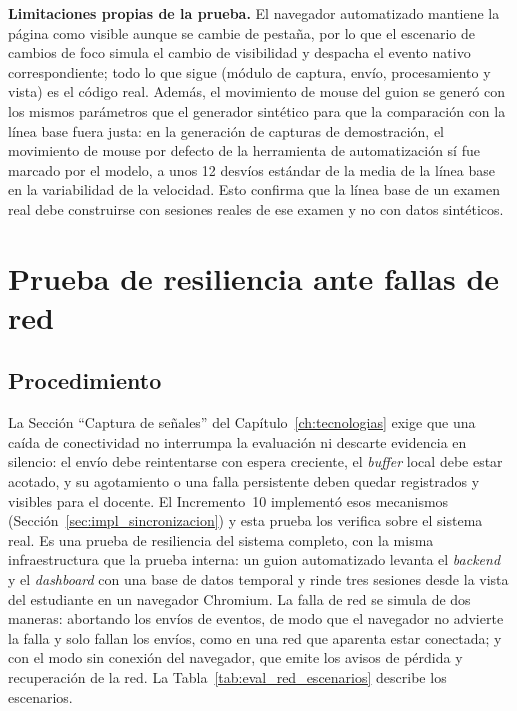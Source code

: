 \textbf{Limitaciones propias de la prueba.} El navegador automatizado mantiene la página como visible aunque se cambie de pestaña, por lo que el escenario de cambios de foco simula el cambio de visibilidad y despacha el evento nativo correspondiente; todo lo que sigue (módulo de captura, envío, procesamiento y vista) es el código real. Además, el movimiento de mouse del guion se generó con los mismos parámetros que el generador sintético para que la comparación con la línea base fuera justa: en la generación de capturas de demostración, el movimiento de mouse por defecto de la herramienta de automatización sí fue marcado por el modelo, a unos 12 desvíos estándar de la media de la línea base en la variabilidad de la velocidad. Esto confirma que la línea base de un examen real debe construirse con sesiones reales de ese examen y no con datos sintéticos.

\section{Prueba de resiliencia ante fallas de red}
\label{sec:eval_prueba_red}

\subsection{Procedimiento}

La Sección ``Captura de señales'' del Capítulo~\ref{ch:tecnologias} exige que una caída de conectividad no interrumpa la evaluación ni descarte evidencia en silencio: el envío debe reintentarse con espera creciente, el \textit{buffer} local debe estar acotado, y su agotamiento o una falla persistente deben quedar registrados y visibles para el docente. El Incremento~10 implementó esos mecanismos (Sección~\ref{sec:impl_sincronizacion}) y esta prueba los verifica sobre el sistema real. Es una prueba de resiliencia del sistema completo, con la misma infraestructura que la prueba interna: un guion automatizado levanta el \textit{backend} y el \textit{dashboard} con una base de datos temporal y rinde tres sesiones desde la vista del estudiante en un navegador Chromium. La falla de red se simula de dos maneras: abortando los envíos de eventos, de modo que el navegador no advierte la falla y solo fallan los envíos, como en una red que aparenta estar conectada; y con el modo sin conexión del navegador, que emite los avisos de pérdida y recuperación de la red. La Tabla~\ref{tab:eval_red_escenarios} describe los escenarios.

